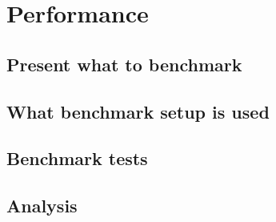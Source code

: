 
\chapter{Performance}
\label{ch:performance}


\section{Present what to benchmark}
\section{What benchmark setup is used}
\section{Benchmark tests}
\section{Analysis}

